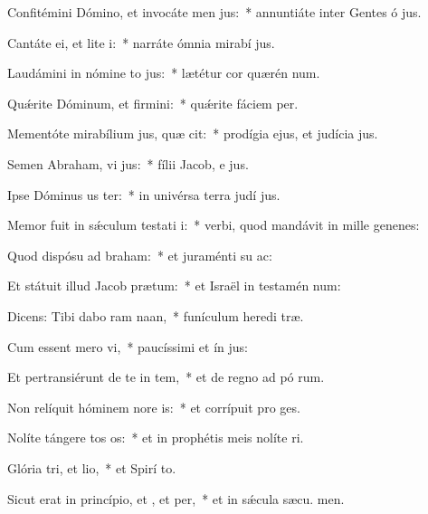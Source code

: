 \item Confitémini Dómino, et invocáte men jus:~* annuntiáte inter Gentes ó jus.
\item Cantáte ei, et lite i:~* narráte ómnia mirabí jus.
\item Laudámini in nómine to jus:~* lætétur cor quærén num.
\item Quǽrite Dóminum, et firmini:~* quǽrite fáciem  per.
\item Mementóte mirabílium jus, quæ cit:~* prodígia ejus, et judícia  jus.
\item Semen Abraham, vi jus:~* fílii Jacob, e jus.
\item Ipse Dóminus us ter:~* in univérsa terra judí jus.
\item Memor fuit in sǽculum testati i:~* verbi, quod mandávit in mille genenes:
\item Quod dispósu ad braham:~* et juraménti su  ac:
\item Et státuit illud Jacob  prætum:~* et Israël in testamén num:
\item Dicens: Tibi dabo ram naan,~* funículum heredi træ.
\item Cum essent mero vi,~* paucíssimi et ín jus:
\item Et pertransiérunt de te in tem,~* et de regno ad pó rum.
\item Non relíquit hóminem nore is:~* et corrípuit pro  ges.
\item Nolíte tángere tos os:~* et in prophétis meis nolíte ri.
\item Glória tri, et lio,~* et Spirí to.
\item Sicut erat in princípio, et , et per,~* et in sǽcula sæcu. men.
